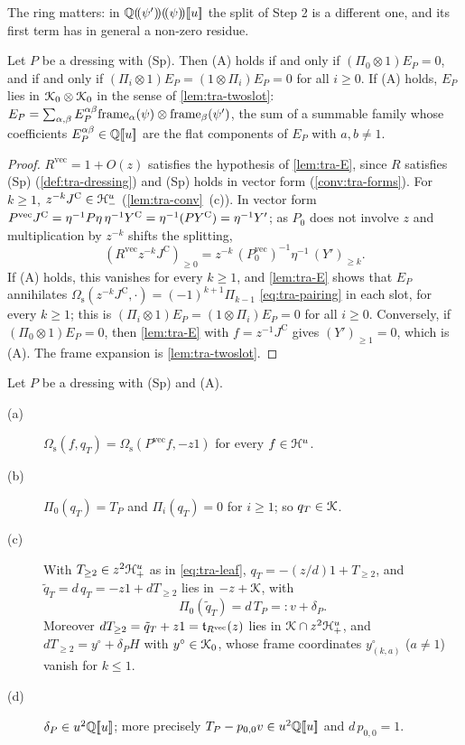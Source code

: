 The ring matters: in $\mathbb{Q}(\!(\psi')\!)(\!(\psi)\!)[\![ u ]\!]$ the split of Step 2 is a different one, and its first term has in general a non-zero residue.

\begin{cor}
\label{cor:tra-edges}
Let $P$ be a dressing with (Sp). Then (A) holds if and only if $(\Pi_0\otimes 1)E_P = 0$, and if and only if $(\Pi_i\otimes 1)E_P = (1\otimes\Pi_i)E_P = 0$ for all $i\geq 0$. If (A) holds, $E_P$ lies in $\mathcal{K}_{0}\otimes\mathcal{K}_{0}$ in the sense of \cref{lem:tra-twoslot}: $E_P = \sum_{\alpha,\beta}E_P^{\alpha\beta}\mathrm{frame}_\alpha(\psi)\otimes\mathrm{frame}_\beta(\psi')$, the sum of a summable family whose coefficients $E_P^{\alpha\beta}\in\mathbb{Q}[\![ u ]\!]$ are the flat components of $E_P$ with $a,b\neq 1$.
\end{cor}

\begin{proof}
$R^{\mathrm{vec}} = 1+O(z)$ satisfies the hypothesis of \cref{lem:tra-E}, since $R$ satisfies (Sp) (\cref{def:tra-dressing}) and (Sp) holds in vector form (\cref{conv:tra-forms}). For $k\geq 1$, $z^{-k}J^{\mathrm C}\in\mathcal{H}^u_-$ (\cref{lem:tra-conv}~(c)). In vector form $P^{\mathrm{vec}}J^{\mathrm C} = \eta^{-1}P\eta\,\eta^{-1}Y^{\mathrm{C}} = \eta^{-1}(PY^{\mathrm{C}}) = \eta^{-1}Y'$; as $P_0$ does not involve $z$ and multiplication by $z^{-k}$ shifts the splitting,
\[
(R^{\mathrm{vec}}z^{-k}J^{\mathrm C})_{\geq 0} = z^{-k}\,(P_0^{\mathrm{vec}})^{-1}\eta^{-1}\,(Y')_{\geq k} .
\]
If (A) holds, this vanishes for every $k\geq 1$, and \cref{lem:tra-E} shows that $E_P$ annihilates $\Omega_{\mathrm s}(z^{-k}J^{\mathrm C},\cdot) = (-1)^{k+1}\Pi_{k-1}$ \eqref{eq:tra-pairing} in each slot, for every $k\geq 1$; this is $(\Pi_i\otimes 1)E_P = (1\otimes\Pi_i)E_P = 0$ for all $i\geq 0$. Conversely, if $(\Pi_0\otimes 1)E_P = 0$, then \cref{lem:tra-E} with $f = z^{-1}J^{\mathrm C}$ gives $(Y')_{\geq 1} = 0$, which is (A). The frame expansion is \cref{lem:tra-twoslot}.
\end{proof}

\begin{lem}
\label{lem:tra-T}
Let $P$ be a dressing with (Sp) and (A).
\begin{description}
\item[(a)] $\Omega_{\mathrm s}(f,q_T) = \Omega_{\mathrm s}(P^{\mathrm{vec}}f,-z1)$ for every $f\in\mathcal{H}^u$.
\item[(b)] $\Pi_0(q_T) = T_P$ and $\Pi_i(q_T) = 0$ for $i\geq 1$; so $q_T\in\mathcal{K}$.
\item[(c)] With $T_{\geq 2}\in z^2\mathcal{H}^u_+$ as in \eqref{eq:tra-leaf}, $q_T = -(z/d)1+T_{\geq 2}$, and $\tilde q_T = d\,q_T = -z1+dT_{\geq 2}$ lies in $-z+\mathcal{K}$, with
\[
\Pi_0(\tilde q_T) = d\,T_P =: v+\delta_P .
\]
Moreover $dT_{\geq 2} = \tilde q_T+z1 = \mathfrak{t}_{R^{\mathrm{vec}}}(z)$ lies in $\mathcal{K}\cap z^2\mathcal{H}^u_+$, and $dT_{\geq 2} = y^\circ+\delta_PH$ with $y^\circ\in\mathcal{K}_{0}$, whose frame coordinates $y^\circ_{(k,a)}$ ($a\neq 1$) vanish for $k\leq 1$.
\item[(d)] $\delta_P\in u^2\mathbb{Q}[\![ u ]\!]$; more precisely $T_P-p_{0,0}v\in u^2\mathbb{Q}[\![ u ]\!]$ and $d\,p_{0,0} = 1$.
\end{description}
\end{lem}

